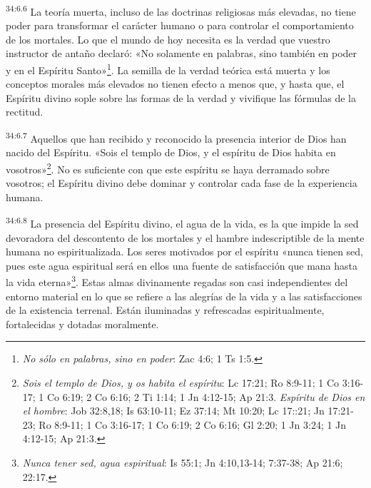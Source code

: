 \par
\textsuperscript{34:6.6} La teoría muerta, incluso de las doctrinas religiosas más elevadas, no tiene poder para transformar el carácter humano o para controlar el comportamiento de los mortales. Lo que el mundo de hoy necesita es la verdad que vuestro instructor de antaño declaró: «No solamente en palabras, sino también en poder y en el Espíritu Santo»\footnote{\textit{No sólo en palabras, sino en poder}: Zac 4:6; 1 Ts 1:5.}. La semilla de la verdad teórica está muerta y los conceptos morales más elevados no tienen efecto a menos que, y hasta que, el Espíritu divino sople sobre las formas de la verdad y vivifique las fórmulas de la rectitud.

\par
\textsuperscript{34:6.7} Aquellos que han recibido y reconocido la presencia interior de Dios han nacido del Espíritu. «Sois el templo de Dios, y el espíritu de Dios habita en vosotros»\footnote{\textit{Sois el templo de Dios, y os habita el espíritu}: Lc 17:21; Ro 8:9-11; 1 Co 3:16-17; 1 Co 6:19; 2 Co 6:16; 2 Ti 1:14; 1 Jn 4:12-15; Ap 21:3. \textit{Espíritu de Dios en el hombre}: Job 32:8,18; Is 63:10-11; Ez 37:14; Mt 10:20; Lc 17::21; Jn 17:21-23; Ro 8:9-11; 1 Co 3:16-17; 1 Co 6:19; 2 Co 6:16; Gl 2:20; 1 Jn 3:24; 1 Jn 4:12-15; Ap 21:3.}. No es suficiente con que este espíritu se haya derramado sobre vosotros; el Espíritu divino debe dominar y controlar cada fase de la experiencia humana.

\par
\textsuperscript{34:6.8} La presencia del Espíritu divino, el agua de la vida, es la que impide la sed devoradora del descontento de los mortales y el hambre indescriptible de la mente humana no espiritualizada. Los seres motivados por el espíritu «nunca tienen sed, pues este agua espiritual será en ellos una fuente de satisfacción que mana hasta la vida eterna»\footnote{\textit{Nunca tener sed, agua espiritual}: Is 55:1; Jn 4:10,13-14; 7:37-38; Ap 21:6; 22:17.}. Estas almas divinamente regadas son casi independientes del entorno material en lo que se refiere a las alegrías de la vida y a las satisfacciones de la existencia terrenal. Están iluminadas y refrescadas espiritualmente, fortalecidas y dotadas moralmente.

